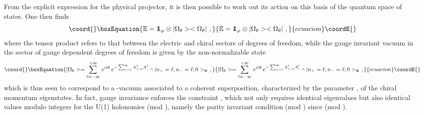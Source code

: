 \documentclass[a4paper,11pt]{article}
\def\one{1\hskip -.37em 1}
\def\proj{\mathbb E}
\def\Z{\mathbb Z}
\begin{document}
From the explicit expression for the physical projector, it is then possible
to work out its action on this basis of the quantum space of states.\cite{Gaby}
One then finds
\begin{equation}\coord{}\boxEquation{
\proj=\one_\varphi\otimes|\Omega_\theta><\Omega_\theta|\ ,
}{
\proj=\one_\varphi\otimes|\Omega_\theta><\Omega_\theta|\ ,
}{ecuacion}\coordE{}\end{equation}
where the tensor product refers to that between the
electric and chiral sectors of degrees of freedom, while the gauge
invariant vacuum \myHighlight{$|\Omega_\theta>$}\coordHE{} in the sector of gauge dependent degrees
of freedom is given by the non-normalizable state
\begin{equation}\coord{}\boxEquation{
|\Omega_\theta>=\sum_{\ell=-\infty}^{+\infty}\,e^{i\ell\theta}\,
e^{-\sum_{n=1}^\infty A^\dagger_{+,n}A^\dagger_{-,n}}\,
|n_+=\ell,n_-=\ell;0>_\Phi\ ,
\label{eq:Thetavac}
}{
|\Omega_\theta>=\sum_{\ell=-\infty}^{+\infty}\,e^{i\ell\theta}\,
e^{-\sum_{n=1}^\infty A^\dagger_{+,n}A^\dagger_{-,n}}\,
|n_+=\ell,n_-=\ell;0>_\Phi\ ,
}{ecuacion}\coordE{}\end{equation}
which is thus seen to correspond to a \myHighlight{$\theta$}\coordHE{}-vacuum associated to
a coherent superposition, characterized by the parameter
\myHighlight{$\theta$}\coordHE{}, of the chiral momentum eigenstates. In fact, gauge invariance
enforces the constraint \coordHE{}, which not only requires identical
eigenvalues \coordHE{} but also identical values modulo integers for 
the U(1) holonomies \myHighlight{$\lambda_+=\lambda_-$}\coordHE{} (mod \myHighlight{$\Z$}\coordHE{}), namely the parity 
invariant condition \myHighlight{$\alpha_+=\alpha=\alpha_-$}\coordHE{} (mod \myHighlight{$\Z$}\coordHE{}) since 
\myHighlight{$\alpha_\pm=\lambda\lambda_\pm$}\coordHE{} (mod \myHighlight{$\Z$}\coordHE{}).
\end{document}
